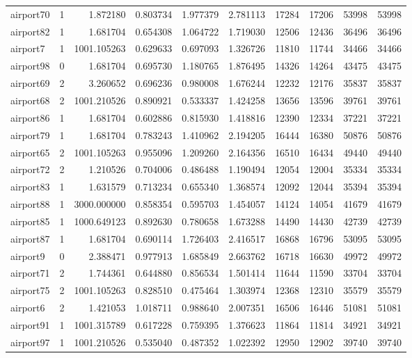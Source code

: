 \begin{longtable}{|l|r|r|r|r|r|r|r|r|r|}
airport70 & 1 & 1.872180 & 0.803734 & 1.977379 & 2.781113 & 17284 & 17206 & 53998 & 53998 \\
airport82 & 1 & 1.681704 & 0.654308 & 1.064722 & 1.719030 & 12506 & 12436 & 36496 & 36496 \\
airport7 & 1 & 1001.105263 & 0.629633 & 0.697093 & 1.326726 & 11810 & 11744 & 34466 & 34466 \\
airport98 & 0 & 1.681704 & 0.695730 & 1.180765 & 1.876495 & 14326 & 14264 & 43475 & 43475 \\
airport69 & 2 & 3.260652 & 0.696236 & 0.980008 & 1.676244 & 12232 & 12176 & 35837 & 35837 \\
airport68 & 2 & 1001.210526 & 0.890921 & 0.533337 & 1.424258 & 13656 & 13596 & 39761 & 39761 \\
airport86 & 1 & 1.681704 & 0.602886 & 0.815930 & 1.418816 & 12390 & 12334 & 37221 & 37221 \\
airport79 & 1 & 1.681704 & 0.783243 & 1.410962 & 2.194205 & 16444 & 16380 & 50876 & 50876 \\
airport65 & 2 & 1001.105263 & 0.955096 & 1.209260 & 2.164356 & 16510 & 16434 & 49440 & 49440 \\
airport72 & 2 & 1.210526 & 0.704006 & 0.486488 & 1.190494 & 12054 & 12004 & 35334 & 35334 \\
airport83 & 1 & 1.631579 & 0.713234 & 0.655340 & 1.368574 & 12092 & 12044 & 35394 & 35394 \\
airport88 & 1 & 3000.000000 & 0.858354 & 0.595703 & 1.454057 & 14124 & 14054 & 41679 & 41679 \\
airport85 & 1 & 1000.649123 & 0.892630 & 0.780658 & 1.673288 & 14490 & 14430 & 42739 & 42739 \\
airport87 & 1 & 1.681704 & 0.690114 & 1.726403 & 2.416517 & 16868 & 16796 & 53095 & 53095 \\
airport9 & 0 & 2.388471 & 0.977913 & 1.685849 & 2.663762 & 16718 & 16630 & 49972 & 49972 \\
airport71 & 2 & 1.744361 & 0.644880 & 0.856534 & 1.501414 & 11644 & 11590 & 33704 & 33704 \\
airport75 & 2 & 1001.105263 & 0.828510 & 0.475464 & 1.303974 & 12368 & 12310 & 35579 & 35579 \\
airport6 & 2 & 1.421053 & 1.018711 & 0.988640 & 2.007351 & 16506 & 16446 & 51081 & 51081 \\
airport91 & 1 & 1001.315789 & 0.617228 & 0.759395 & 1.376623 & 11864 & 11814 & 34921 & 34921 \\
airport97 & 1 & 1001.210526 & 0.535040 & 0.487352 & 1.022392 & 12950 & 12902 & 39740 & 39740 \\

\end{longtable}
